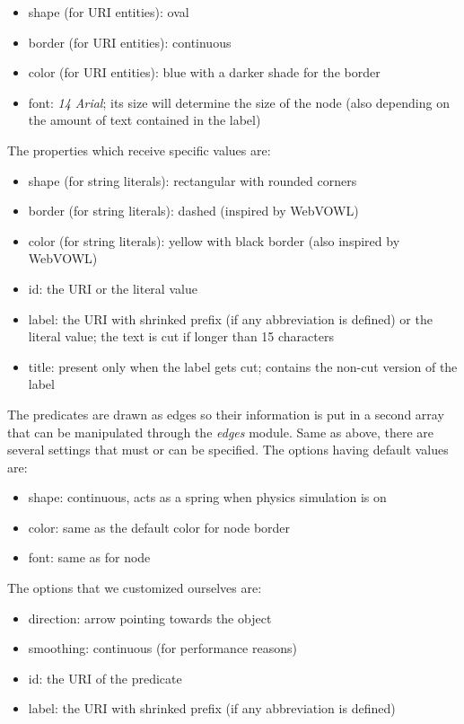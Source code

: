 \begin{itemize}
	\item shape (for URI entities): oval
	\item border (for URI entities): continuous
	\item color (for URI entities): blue with a darker shade for the border
	\item font: \textit{14 Arial}; its size will determine the size of the node (also depending on the amount of text contained in the label)
\end{itemize}

The properties which receive specific values are:

\begin{itemize}[label={$\circ$}]
	\item shape (for string literals): rectangular with rounded corners
	\item border (for string literals): dashed (inspired by WebVOWL)
	\item color (for string literals): yellow with black border (also inspired by WebVOWL)
	\item id: the URI or the literal value
	\item label: the URI with shrinked prefix (if any abbreviation is defined) or the literal value; the text is cut if longer than 15 characters
	\item title: present only when the label gets cut; contains the non-cut version of the label	
\end{itemize}

The predicates are drawn as edges so their information is put in a second array that can be manipulated through the \textit{edges} module. Same as above, there are several settings that must or can be specified. The options having default values are:

\begin{itemize}
	\item shape: continuous, acts as a spring when physics simulation is on
	\item color: same as the default color for node border
	\item font: same as for node
\end{itemize}

The options that we customized ourselves are:

\begin{itemize}[label={$\circ$}]
	\item direction: arrow pointing towards the object
	\item smoothing: continuous (for performance reasons)
	\item id: the URI of the predicate
	\item label: the URI with shrinked prefix (if any abbreviation is defined)
\end{itemize}

